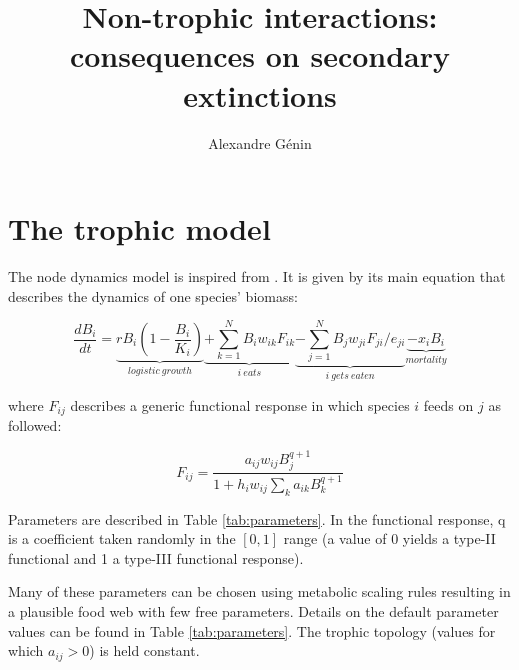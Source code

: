 \documentclass[a4paper,11pt]{article}
\title{Non-trophic interactions: consequences on secondary extinctions}
\author{Alexandre Génin}
\begin{document}
  
  \maketitle 
  
  \section{The trophic model}
      
      
      The node dynamics model is inspired from \autocite{Brose2006}. It is 
given by its main equation that describes the dynamics of one species' biomass: 
    
    \begin{equation}
      \label{eq:popdyn}
      \frac{dB_i}{dt} = \underbrace{rB_i(1 - \frac{B_i}{K_i})}_{logistic\ growth}
                        \underbrace{+ \sum_{k=1}^{N} B_i w_{ik} F_{ik}}_{i\ eats}
                        \underbrace{- \sum_{j=1}^{N} B_j w_{ji} F_{ji} / e_{ji}}_{i\ gets\ eaten}
                        \underbrace{- x_i B_i}_{mortality}
    \end{equation}
    
    where $F_{ij}$ describes a generic functional response in which species $i$ 
feeds on $j$ as followed: 
    
    \begin{equation}
      F_{ij} = \frac{a_{ij} w_{ij} B_{j}^{q+1} }{ 
                       1 + h_{i} w_{ij} \sum_{k} a_{ik} B_{k}^{q+1} }
    \end{equation}
    
    Parameters are described in Table \ref{tab:parameters}. In the functional 
response, q is a coefficient taken randomly in the $[0,1]$ range (a value of 0 
yields a type-II functional and 1 a type-III functional response).
    
    Many of these parameters can be chosen using metabolic scaling rules 
resulting in a plausible food web with few free parameters. Details on the 
default parameter values can be found in Table \ref{tab:parameters}. The trophic 
topology (values for which $a_{ij}>0$) is held constant.
    
\end{document}
